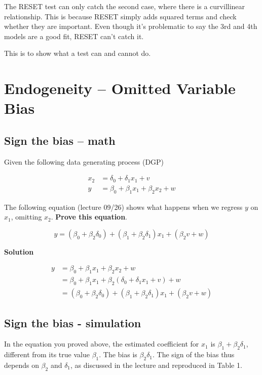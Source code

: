 \documentclass{article}\usepackage[]{graphicx}\usepackage[]{color}
\begin{document}
The RESET test can only catch the second case, where there is a curvillinear relationship. This is because RESET simply adds squared terms and check whether they are important. Even though it's problematic to say the 3rd and 4th models are a good fit, RESET can't catch it.

This is to show what a test can and cannot do.

\section{Endogeneity -- Omitted Variable Bias}

\subsection{Sign the bias -- math}

Given the following data generating process (DGP)

\begin{align}
x_2 &= \delta_0 + \delta_1 x_1 + v \\
y &= \beta_0 + \beta_1 x_1 + \beta_2 x_2 + w
\end{align}

The following equation (lecture 09/26) shows what happens when we regress $y$ on $x_1$, omitting $x_2$. \textbf{Prove this equation}.

$$
y = (\beta_0 + \beta_2 \delta_0) + (\beta_1 + \beta_2 \delta_1) x_1 + (\beta_2 v + w)
$$



\textbf{Solution}

\begin{align}
y &= \beta_0 + \beta_1 x_1 + \beta_2 x_2 + w \\
&= \beta_0 + \beta_1 x_1 + \beta_2 (\delta_0 + \delta_1 x_1 + v) + w \\
&= (\beta_0 + \beta_2 \delta_0) + (\beta_1 + \beta_2 \delta_1) x_1 + (\beta_2 v + w)
\end{align}

\subsection{Sign the bias - simulation}

In the equation you proved above, the estimated coefficient for $x_1$ is $\beta_1 + \beta_2 \delta_1$, different from its true value $\beta_1$. The bias is $\beta_2\delta_1$. The sign of the bias thus depends on $\beta_2$ and $\delta_1$, as discussed in the lecture and reproduced in Table 1.
\end{document}
